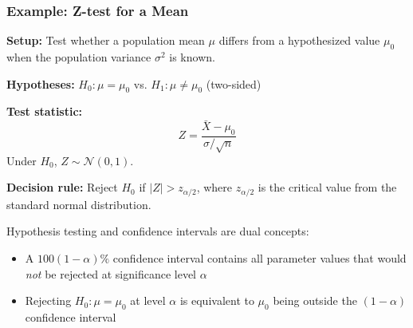 \subsubsection{Example: Z-test for a Mean}

\textbf{Setup:} Test whether a population mean $\mu$ differs from a hypothesized value $\mu_0$ when the population variance $\sigma^2$ is known.

\textbf{Hypotheses:} $H_0: \mu = \mu_0$ vs. $H_1: \mu \neq \mu_0$ (two-sided)

\textbf{Test statistic:}
\begin{equation}
Z = \frac{\bar{X} - \mu_0}{\sigma/\sqrt{n}}
\end{equation}
Under $H_0$, $Z \sim \mathcal{N}(0, 1)$.

\textbf{Decision rule:} Reject $H_0$ if $|Z| > z_{\alpha/2}$, where $z_{\alpha/2}$ is the critical value from the standard normal distribution.

\begin{keyconceptbox}[title=Connection to Confidence Intervals]
Hypothesis testing and confidence intervals are dual concepts:
\begin{itemize}
    \item A $100(1-\alpha)\%$ confidence interval contains all parameter values that would \textit{not} be rejected at significance level $\alpha$
    \item Rejecting $H_0: \mu = \mu_0$ at level $\alpha$ is equivalent to $\mu_0$ being outside the $(1-\alpha)$ confidence interval
\end{itemize}
\end{keyconceptbox}

